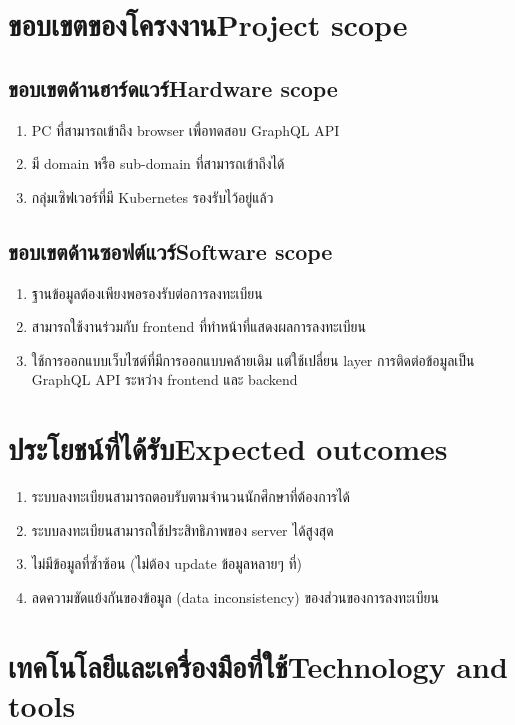 \section{\ifcpe ขอบเขตของโครงงาน\else Project scope\fi}

\subsection{\ifcpe ขอบเขตด้านฮาร์ดแวร์\else Hardware scope\fi}
\begin{enumerate}
    \item PC ที่สามารถเข้าถึง browser เพื่อทดสอบ GraphQL API
    \item มี domain หรือ sub-domain ที่สามารถเข้าถึงได้
    \item กลุ่มเซิฟเวอร์ที่มี Kubernetes รองรับไว้อยู่แล้ว
\end{enumerate}
\subsection{\ifcpe ขอบเขตด้านซอฟต์แวร์\else Software scope\fi}
\begin{enumerate}
    \item ฐานข้อมูลต้องเพียงพอรองรับต่อการลงทะเบียน
    \item สามารถใช้งานร่วมกับ frontend ที่ทำหน้าที่แสดงผลการลงทะเบียน
    \item ใช้การออกแบบเว็บไซต์ที่มีการออกแบบคล้ายเดิม แต่ใช้เปลี่ยน layer การติดต่อข้อมูลเป็น GraphQL API \cite{graphql} ระหว่าง frontend และ backend
\end{enumerate}
\section{\ifcpe ประโยชน์ที่ได้รับ\else Expected outcomes\fi}
\begin{enumerate}
    \item ระบบลงทะเบียนสามารถตอบรับตามจำนวนนักศึกษาที่ต้องการได้
    \item ระบบลงทะเบียนสามารถใช้ประสิทธิภาพของ server ได้สูงสุด
    \item ไม่มีข้อมูลที่ซ้ำซ้อน (ไม่ต้อง update ข้อมูลหลายๆ ที่)
    \item ลดความขัดแย้งกันของข้อมูล (data inconsistency) ของส่วนของการลงทะเบียน
\end{enumerate}

\section{\ifcpe เทคโนโลยีและเครื่องมือที่ใช้\else Technology and tools\fi}

